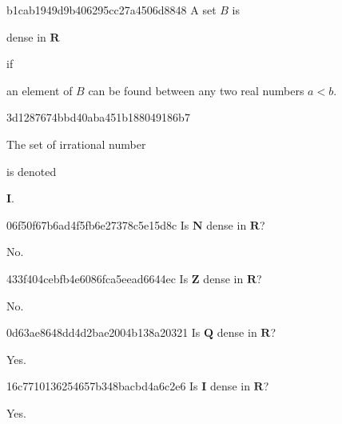 \begin{note}{b1cab1949d9b406295cc27a4506d8848}
    A set \({ B }\) is \begin{icloze}{2}dense in \({ \mathbf{R} }\)\end{icloze} if \begin{icloze}{1}an element of \({ B }\) can be found between any two real numbers \({ a < b }\).\end{icloze}
\end{note}

\begin{note}{3d1287674bbd40aba451b188049186b7}
    \begin{icloze}{2}The set of irrational number\end{icloze} is denoted \begin{icloze}{1}\({ \mathbf{I} }\).\end{icloze}
\end{note}

\begin{note}{06f50f67b6ad4f5fb6e27378c5e15d8c}
    Is \({ \mathbf{N} }\) dense in \({ \mathbf{R} }\)?

    \begin{cloze}{1}
        No.
    \end{cloze}
\end{note}

\begin{note}{433f404cebfb4e6086fca5eead6644ec}
    Is \({ \mathbf{Z} }\) dense in \({ \mathbf{R} }\)?

    \begin{cloze}{1}
        No.
    \end{cloze}
\end{note}

\begin{note}{0d63ae8648dd4d2bae2004b138a20321}
    Is \({ \mathbf{Q} }\) dense in \({ \mathbf{R} }\)?

    \begin{cloze}{1}
        Yes.
    \end{cloze}
\end{note}

\begin{note}{16c7710136254657b348bacbd4a6c2e6}
    Is \({ \mathbf{I} }\) dense in \({ \mathbf{R} }\)?

    \begin{cloze}{1}
        Yes.
    \end{cloze}
\end{note}

